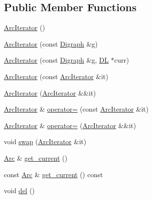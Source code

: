 \subsection*{Public Member Functions}
\begin{DoxyCompactItemize}
\item 
\hyperlink{class_designar_1_1_digraph_1_1_arc_iterator_a0f540c556301e1d4e0a9d48433257b89}{Arc\+Iterator} ()
\item 
\hyperlink{class_designar_1_1_digraph_1_1_arc_iterator_ac16db42766a60aa488fb4db5492c1361}{Arc\+Iterator} (const \hyperlink{class_designar_1_1_digraph}{Digraph} \&g)
\item 
\hyperlink{class_designar_1_1_digraph_1_1_arc_iterator_ae4a8b9172d19134e71693734003ee350}{Arc\+Iterator} (const \hyperlink{class_designar_1_1_digraph}{Digraph} \&g, \hyperlink{class_designar_1_1_d_l}{DL} $\ast$curr)
\item 
\hyperlink{class_designar_1_1_digraph_1_1_arc_iterator_a78fe9751892ba8eaa56aaba4a176666c}{Arc\+Iterator} (const \hyperlink{class_designar_1_1_digraph_1_1_arc_iterator}{Arc\+Iterator} \&it)
\item 
\hyperlink{class_designar_1_1_digraph_1_1_arc_iterator_acb84eb022d5113512f9c272dc47fd2da}{Arc\+Iterator} (\hyperlink{class_designar_1_1_digraph_1_1_arc_iterator}{Arc\+Iterator} \&\&it)
\item 
\hyperlink{class_designar_1_1_digraph_1_1_arc_iterator}{Arc\+Iterator} \& \hyperlink{class_designar_1_1_digraph_1_1_arc_iterator_a6a048ab6882106fc0d433a7c9fab297f}{operator=} (const \hyperlink{class_designar_1_1_digraph_1_1_arc_iterator}{Arc\+Iterator} \&it)
\item 
\hyperlink{class_designar_1_1_digraph_1_1_arc_iterator}{Arc\+Iterator} \& \hyperlink{class_designar_1_1_digraph_1_1_arc_iterator_a0ac762b04a286813cbed33857996c7cb}{operator=} (\hyperlink{class_designar_1_1_digraph_1_1_arc_iterator}{Arc\+Iterator} \&\&it)
\item 
void \hyperlink{class_designar_1_1_digraph_1_1_arc_iterator_a73ca00e5bcc478168ae16a73149becb1}{swap} (\hyperlink{class_designar_1_1_digraph_1_1_arc_iterator}{Arc\+Iterator} \&it)
\item 
\hyperlink{class_designar_1_1_digraph_a0ceb278671f2a535c00fddccdeafd69f}{Arc} \& \hyperlink{class_designar_1_1_digraph_1_1_arc_iterator_af7734cd84a4dd523f276064833abaa85}{get\+\_\+current} ()
\item 
const \hyperlink{class_designar_1_1_digraph_a0ceb278671f2a535c00fddccdeafd69f}{Arc} \& \hyperlink{class_designar_1_1_digraph_1_1_arc_iterator_a665f22163e2cc026f0b95f964ae6e048}{get\+\_\+current} () const
\item 
void \hyperlink{class_designar_1_1_digraph_1_1_arc_iterator_aa4f42b888685025c5c3f2e730df4eb36}{del} ()
\end{DoxyCompactItemize}
